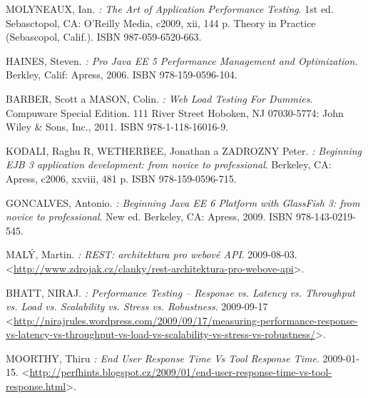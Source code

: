 \documentclass[122pt,oneside]{fithesis}
\begin{document}
\begin{thebibliography}{99}

MOLYNEAUX, Ian.
\emph{: The Art of Application Performance Testing}.
1st ed. Sebasctopol, CA: O'Reilly Media, c2009, xii, 144 p. Theory in Practice (Sebascopol, Calif.). 
ISBN 987-059-6520-663.

HAINES, Steven.
\emph{: Pro Java EE 5 Performance Management and Optimization}.
Berkley, Calif: Apress, 2006.
ISBN 978-159-0596-104.

BARBER, Scott a MASON, Colin.
\emph{: Web Load Testing For Dummies}.
Compuware Special Edition. 111 River Street Hoboken, NJ 07030-5774: John Wiley \& Sons, Inc., 2011.
ISBN 978-1-118-16016-9.
	  
KODALI, Raghu R, WETHERBEE, Jonathan a ZADROZNY Peter.
\emph{: Beginning EJB 3 application development: from novice to professional}.
Berkeley, CA: Apress, c2006, xxviii, 481 p.
ISBN 978-159-0596-715. 

GONCALVES, Antonio.
\emph{: Beginning Java EE 6 Platform with GlassFish 3: from novice to professional}.
New ed. Berkeley, CA: Apress, 2009.
ISBN 978-143-0219-545. 

MALÝ, Martin.
\emph{: REST: architektura pro webové API}.
2009-08-03.
\textless\href{http://www.zdrojak.cz/clanky/rest-architektura-pro-webove-api/}{http://www.zdrojak.cz/clanky/rest-architektura-pro-webove-api}\textgreater.

BHATT, NIRAJ.
\emph{: Performance Testing – Response vs. Latency vs. Throughput vs. Load vs. Scalability vs. Stress vs. Robustness}.
2009-09-17
\textless\href{http://nirajrules.wordpress.com/2009/09/17/measuring-performance-response-vs-latency-vs-throughput-vs-load-vs-scalability-vs-stress-vs-robustness/}{http://nirajrules.wordpress.com/2009/09/17/measuring-performance-response-vs-latency-vs-throughput-vs-load-vs-scalability-vs-stress-vs-robustness/}\textgreater.

MOORTHY, Thiru
\emph{:  End User Response Time Vs Tool Response Time}.
2009-01-15.
\textless\href{http://perfhints.blogspot.cz/2009/01/end-user-response-time-vs-tool-response.html}{http://perfhints.blogspot.cz/2009/01/end-user-response-time-vs-tool-response.html}\textgreater.


\end{thebibliography}
\end{document}
